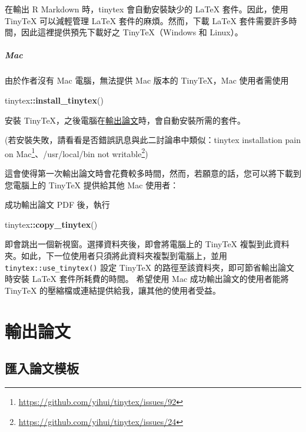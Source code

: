 \documentclass[oneside]{book}
\newenvironment{Shaded}{\begin{snugshade}}{\end{snugshade}}
\newcommand{\KeywordTok}[1]{\textcolor[rgb]{0.13,0.29,0.53}{\textbf{#1}}}
\newcommand{\NormalTok}[1]{#1}
\newcommand{\OperatorTok}[1]{\textcolor[rgb]{0.81,0.36,0.00}{\textbf{#1}}}
\renewcommand{\href}[2]{#2\footnote{\url{#1}}}
\begin{document}
在輸出 R Markdown 時，tinytex 會自動安裝缺少的 LaTeX 套件。因此，使用 TinyTeX 可以減輕管理 LaTeX 套件的麻煩。然而，下載 LaTeX 套件需要許多時間，因此這裡提供預先下載好之 TinyTeX（Windows 和 Linux）。

\hypertarget{mac}{%
\paragraph{Mac}\label{mac}}

由於作者沒有 Mac 電腦，無法提供 Mac 版本的 TinyTeX，Mac 使用者需使用

\begin{Shaded}
\begin{Highlighting}[]
\NormalTok{tinytex}\OperatorTok{::}\KeywordTok{install_tinytex}\NormalTok{()}
\end{Highlighting}
\end{Shaded}

安裝 TinyTeX，之後電腦在\protect\hyperlink{export-thesis}{輸出論文}時，會自動安裝所需的套件。

(若安裝失敗，請看看是否錯誤訊息與此二討論串中類似：\href{https://github.com/yihui/tinytex/issues/92}{tinytex installation pain on Mac}、\href{https://github.com/yihui/tinytex/issues/24}{/usr/local/bin not writable})

這會使得第一次輸出論文時會花費較多時間，然而，若願意的話，您可以將下載到您電腦上的 TinyTeX 提供給其他 Mac 使用者：

成功輸出論文 PDF 後，執行

\begin{Shaded}
\begin{Highlighting}[]
\NormalTok{tinytex}\OperatorTok{::}\KeywordTok{copy_tinytex}\NormalTok{()}
\end{Highlighting}
\end{Shaded}

即會跳出一個新視窗。選擇資料夾後，即會將電腦上的 TinyTeX 複製到此資料夾。如此，下一位使用者只須將此資料夾複製到電腦上，並用 \texttt{tinytex::use\_tinytex()} 設定 TinyTeX 的路徑至該資料夾，即可節省輸出論文時安裝 LaTeX 套件所耗費的時間。
希望使用 Mac 成功輸出論文的使用者能將 TinyTeX 的壓縮檔或連結提供給我，讓其他的使用者受益。

\hypertarget{export-thesis}{%
\chapter{輸出論文}\label{export-thesis}}

\hypertarget{import-template}{%
\section{匯入論文模板}\label{import-template}}
\end{document}
